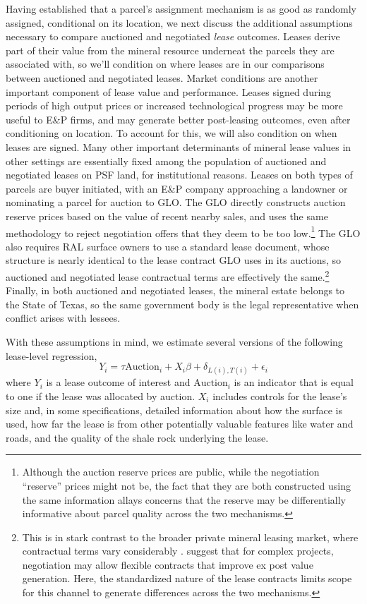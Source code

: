 Having established that a parcel's assignment mechanism is as good as randomly assigned, conditional on its location, we next discuss the additional assumptions necessary to compare auctioned and negotiated \emph{lease} outcomes. Leases derive part of their value from the mineral resource underneat the parcels they are associated with, so we'll condition on where leases are in our comparisons between auctioned and negotiated leases. Market conditions are another important component of lease value and performance. Leases signed during periods of high output prices or increased technological progress may be more useful to E\&P firms, and may generate better post-leasing outcomes, even after conditioning on location.  To account for this, we will also condition on when leases are signed. Many other important determinants of mineral lease values in other settings are essentially fixed among the population of auctioned and negotiated leases on PSF land, for institutional reasons. Leases on both types of parcels are buyer initiated, with an E\&P company approaching a landowner or nominating a parcel for auction to GLO. The GLO directly constructs auction reserve prices based on the value of recent nearby sales, and uses the same methodology to reject negotiation offers that they deem to be too low.\footnote{Although the auction reserve prices are public, while the negotiation ``reserve'' prices might not be, the fact that they are both constructed using the same information allays concerns that the reserve may be differentially informative about parcel quality across the two mechanisms.} The GLO also requires RAL surface owners to use a standard lease document, whose structure is nearly identical to the lease contract GLO uses in its auctions, so auctioned and negotiated lease contractual terms are effectively the same.\footnote{This is in stark contrast to the broader private mineral leasing market, where contractual terms vary considerably \citep{timmins2017environmental}. \citet{bajari_auctions_2009} suggest that for complex projects, negotiation may allow flexible contracts that improve ex post value generation. Here, the standardized nature of the lease contracts limits scope for this channel to generate differences across the two mechanisms.} Finally, in both auctioned and negotiated leases, the mineral estate belongs to the State of Texas, so the same government body is the legal representative when conflict arises with lessees.  

With these assumptions in mind, we estimate several versions of the following lease-level regression,
\begin{equation}
 	Y_i = \tau \text{Auction}_i + X_i \beta + \delta_{L(i),T(i)} + \epsilon_i \label{eq:mainAuction}
\end{equation}
where $Y_i$ is a lease outcome of interest and $\text{Auction}_i$ is an indicator that is equal to one if the lease was allocated by auction. $X_i$ includes controls for the lease's size and, in some specifications, detailed information about how the surface is used, how far the lease is from other potentially valuable features like water and roads, and the quality of the shale rock underlying the lease. 

